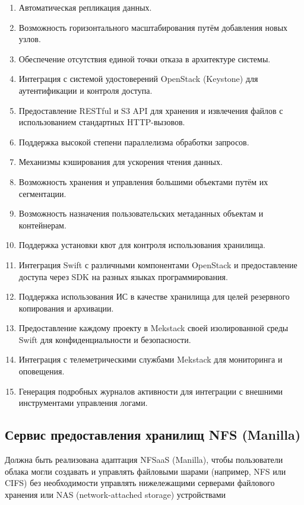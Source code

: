 \documentclass[14pt, a4paper]{extarticle}
\begin{document}
\begin{enumerate}
\item Автоматическая репликация данных.
\item Возможность горизонтального масштабирования путём добавления новых узлов.
\item Обеспечение отсутствия единой точки отказа в архитектуре системы.
\item Интеграция с системой удостоверений OpenStack (Keystone) для аутентификации и контроля доступа.
\item Предоставление RESTful и S3 API для хранения и извлечения файлов с использованием стандартных HTTP-вызовов.
\item Поддержка высокой степени параллелизма обработки запросов.
\item Механизмы кэширования для ускорения чтения данных.
\item Возможность хранения и управления большими объектами путём их сегментации.
\item Возможность назначения пользовательских метаданных объектам и контейнерам.
\item Поддержка установки квот для контроля использования хранилища.
\item Интеграция Swift с различными компонентами OpenStack и предоставление доступа через SDK на разных языках программирования.
\item Поддержка использования ИС в качестве хранилища для целей резервного копирования и архивации.
\item Предоставление каждому проекту в Mekstack своей изолированной среды Swift для конфиденциальности и безопасности.
\item Интеграция с телеметрическими службами Mekstack для мониторинга и оповещения.
\item Генерация подробных журналов активности для интеграции с внешними инструментами управления логами.
\end{enumerate}

\subsection{Сервис предоставления хранилищ NFS (Manilla)}

Должна быть реализована адаптация NFSaaS (Manilla), чтобы пользователи облака могли создавать и управлять файловыми шарами (например, NFS или CIFS) без необходимости управлять нижележащими серверами файлового хранения или NAS (network-attached storage) устройствами
\end{document}
